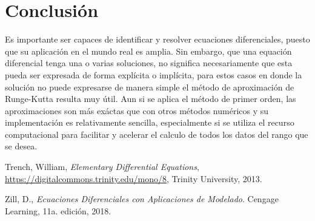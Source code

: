 \documentclass[article, 11pt]{IEEEtran}   %
\begin{document}
\section{Conclusi\'on}
Es importante ser capaces de identificar y resolver ecuaciones diferenciales, puesto que su aplicación en el mundo real es amplia. Sin embargo, que una equación diferencial tenga una o varias soluciones, no significa necesariamente que esta pueda ser expresada de forma explícita o implícita, para estos casos en donde la solución no puede expresarse de manera simple el método de aproximación de Runge-Kutta resulta muy útil. Aun si se aplica el método de primer orden, las aproximaciones son más exáctas que con otros métodos numéricos y su implementación es relativamente sencilla, especialmente si se utiliza el recurso computacional para facilitar y acelerar el calculo de todos los datos del rango que se desea.

\begin{thebibliography}{1}

Trench, William, \emph{Elementary Differential Equations}, \url{https://digitalcommons.trinity.edu/mono/8}, Trinity University, 2013.

Zill, D., \emph{Ecuaciones Diferenciales con Aplicaciones de Modelado}. Cengage Learning, 11a. edición, 2018.

\end{thebibliography}
\end{document}
